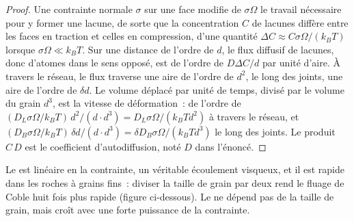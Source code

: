 \begin{proof}
Une contrainte normale $\sigma$ sur une face modifie de $\sigma\Omega$ le travail nécessaire
pour y former une lacune, de sorte que la concentration $C$ de lacunes diffère entre
les faces en traction et celles en compression, d'une quantité $\Delta C \approx C\sigma\Omega/
(k_BT)$ lorsque $\sigma\Omega \ll k_BT$. Sur une distance de l'ordre de $d$, le
flux diffusif de lacunes, donc d'atomes dans le sens opposé, est de l'ordre de $D\Delta
C/d$ par unité d'aire. À travers le réseau, le flux traverse une aire de l'ordre de
$d^2$, le long des joints, une aire de l'ordre de $\delta d$. Le volume déplacé par
unité de temps, divisé par le volume du grain $d^3$, est la vitesse de déformation~: de l'ordre de
$(D_L\sigma\Omega/k_BT)\,d^2/(d\cdot d^3) = D_L\sigma\Omega/(k_BTd^2)$ à travers le
réseau, et $(D_B\sigma\Omega/k_BT)\,\delta d/(d\cdot d^3) = \delta D_B
\sigma\Omega/(k_BTd^3)$ le long des joints. Le produit $C\,D$ est le
coefficient d'autodiffusion, noté $D$ dans l'énoncé.
\end{proof}

Le  est linéaire en la contrainte, un véritable écoulement visqueux, et il est
rapide dans les roches à grains fins~: diviser la taille de grain par deux rend le fluage de Coble huit fois plus rapide
(figure ci-dessous). Le  ne dépend pas de la taille de grain, mais croît
avec une forte puissance de la contrainte.

